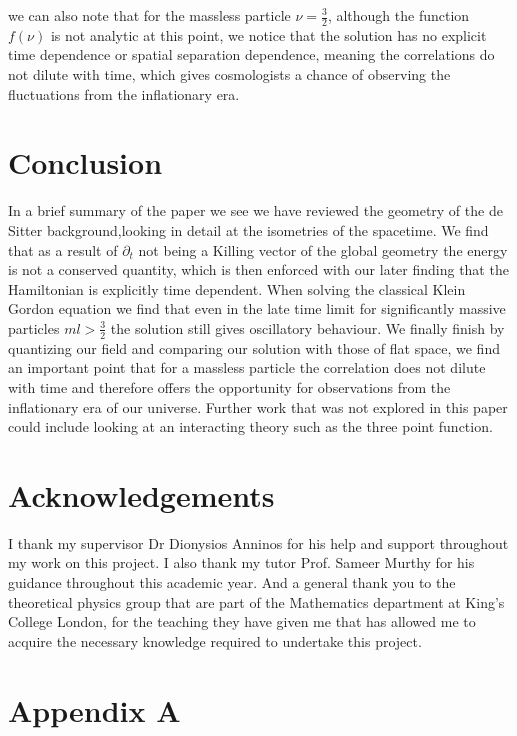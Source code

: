 \documentclass[a4paper,11pt]{article}
\numberwithin{equation}{section}
\numberwithin{figure}{section}
\begin{document}
\begin{large}
we can also note that for the massless particle $\nu=\frac{3}{2}$, although the function $f(\nu)$ is not analytic at this point, we notice that the solution has no explicit time dependence or spatial separation dependence, meaning the correlations do not dilute with time, which gives cosmologists a chance of observing the fluctuations from the inflationary era.  

\newpage

\section{Conclusion}

In a brief summary of the paper we see we have reviewed the geometry of the de Sitter background,looking in detail at the isometries of the spacetime. We find that as a result of $\partial_t$ not being a Killing vector of the global geometry the energy is not a conserved quantity, which is then enforced with our later finding that the Hamiltonian is explicitly time dependent. When solving the classical Klein Gordon equation we find that even in the late time limit for significantly massive particles $ml>\frac{3}{2}$ the solution still gives oscillatory behaviour. We finally finish by quantizing our field and comparing our solution with those of flat space, we find an important point that for a massless particle the correlation does not dilute with time and therefore offers the opportunity for observations from the inflationary era of our universe. Further work that was not explored in this paper could include looking at an interacting theory such as the three point function.


\section*{Acknowledgements}

I thank my supervisor Dr Dionysios Anninos for his help and support throughout my work on this project. I also thank my tutor Prof. Sameer Murthy for his guidance throughout this academic year. And a general thank you to the theoretical physics group that are part of the Mathematics department at King's College London, for the teaching they have given me that has allowed me to acquire the necessary knowledge required to undertake this project.


\newpage

\section*{Appendix A}


\end{large}
\end{document}
